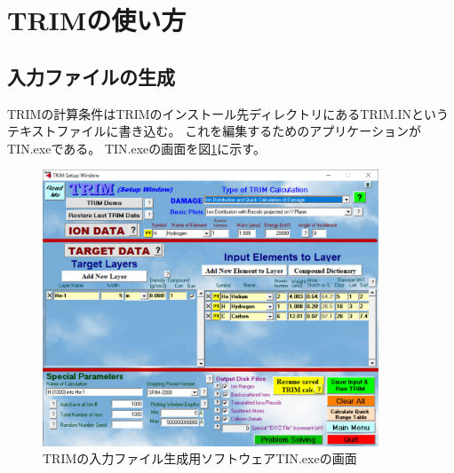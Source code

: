 \documentclass [11pt,a4paper,dvipdfmx] {jarticle}
\begin{document}


\section{TRIMの使い方}
\subsection{入力ファイルの生成}
TRIMの計算条件はTRIMのインストール先ディレクトリにあるTRIM.INというテキストファイルに書き込む。
これを編集するためのアプリケーションがTIN.exeである。
TIN.exeの画面を図\ref{fig:TIN}に示す。

\begin{figure}[H]
    \centering
    \includegraphics[width=10cm]{./pic/TIN.jpg}
    \caption{TRIMの入力ファイル生成用ソフトウェアTIN.exeの画面}
    \label{fig:TIN}
\end{figure}
\end{document}
